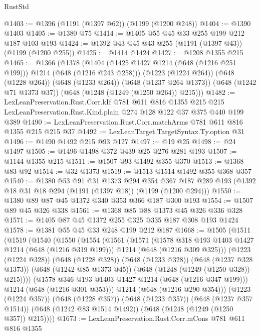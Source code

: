 \begin{lexlean}{RustStd}
\begin{coremodule}
@1403 := @1396 (@1191 (@1397 @62)) (@1199 (@1200 @248))
@1404 := @1390 @1403
@1405 := @1380 @75
@1414 := @1405 @55 @45 @33 @255 @199 @212 @187 @103 @193
@1424 := @1392 @43 @45 @43 @255 (@1191 (@1397 @43)) (@1199 (@1200 @255))
@1425 := @1414 @1424
@1427 := @1208 @1355 @215
@1465 := @1366
    (@1378
      (@1404 (@1425 @1427 @1214 (@648 (@1216 @251 @199))) @1214 (@648 (@1216 @243 @258)))
      (@1223 (@1224 @264))
      (@648 (@1228 @264))
      (@648 (@1233 @264))
      (@648 (@1237 @264 @1373))
      (@648 (@1242 @71 @1373 @37))
      (@648 (@1248 (@1249 (@1250 @264)) @215)))
@1482 := LexLeanPreservation.Rust.Corr.kIf
    @781
    @611
    @816
    @1355
    @215
    @215
    LexLeanPreservation.Rust.Kind.plain
    @274
    @128
    @122
    @37
    @375
    @440
    @199
    @389
@1490 := LexLeanPreservation.Rust.Corr.matchArms @781 @611 @816 @1355 @215 @215 @37
@1492 := LexLeanTarget.TargetSyntax.Ty.option @31
@1496 := @1490 @1492 @215 @93 @127
@1497 := @19 @25
@1498 := @24 @1497
@1505 := @1496 @1498 @372 @439 @25 @276 @281 @193
@1507 := @1144 @1355 @215
@1511 := @1507 @93 @1492 @355 @370
@1513 := @1368 @83 @92
@1514 := @32 @1373
@1519 := @1513 @1514 @1492 @355 @368 @357
@1540 := @1380
    @53
    @91
    @31
    @1373
    @294
    @354
    @367
    @187
    @289
    @193
    (@1392 @18 @31 @18 @294 (@1191 (@1397 @18)) (@1199 (@1200 @294)))
@1550 := @1380 @89 @87 @45 @1372 @340 @353 @366 @187 @300 @193
@1554 := @1507 @89 @45 @326 @338
@1561 := @1368 @85 @88 @1373 @45 @326 @336 @328
@1571 := @1405 @87 @45 @1372 @255 @325 @335 @187 @308 @193 @1424
@1578 := @1381 @55 @45 @33 @248 @199 @212 @187
@1668 := @1505
    (@1511
      (@1519
        (@1540
          (@1550
            (@1554
              (@1561
                (@1571
                  (@1578 @318 @193 @1403 @1427 @1214 (@648 (@1216 @319 @199)))
                  @1214
                  (@648 (@1216 @309 @325)))
                (@1223 (@1224 @328))
                (@648 (@1228 @328))
                (@648 (@1233 @328))
                (@648 (@1237 @328 @1373))
                (@648 (@1242 @85 @1373 @45))
                (@648 (@1248 (@1249 (@1250 @328)) @215))))
            (@1578 @346 @193 @1403 @1427 @1214 (@648 (@1216 @347 @199)))
            @1214
            (@648 (@1216 @301 @353)))
          @1214
          (@648 (@1216 @290 @354)))
        (@1223 (@1224 @357))
        (@648 (@1228 @357))
        (@648 (@1233 @357))
        (@648 (@1237 @357 @1514))
        (@648 (@1242 @83 @1514 @1492))
        (@648 (@1248 (@1249 (@1250 @357)) @215))))
@1673 := LexLeanPreservation.Rust.Corr.mCons @781 @611 @816 @1355

\end{coremodule}
\end{lexlean}
